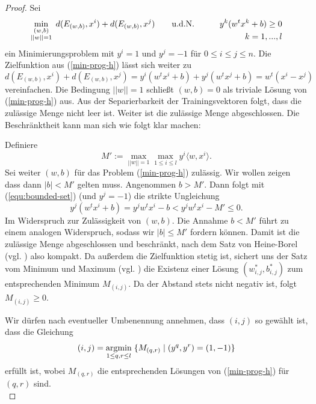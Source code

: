 \begin{proof}
	Sei 
	\begin{equation}
	\begin{aligned} \label{min-prog-h}
		& \smash{\min_{\substack{(w,b) \\ ||w||=1 }} \; 
				d(E_{(w,b)},x^i) + d(E_{(w,b)},x^j)
		} \qquad \text{u.d.N.} 
		\qquad & y^k(w^tx^k+b) \geq 0 \\
			   && k = 1,...,l
	\end{aligned}
	\end{equation}
	ein Minimierungsproblem mit $y^i=1$ und $y^j=-1$ für $0 \leq i \le j \leq n$. Die Zielfunktion aus (\ref{min-prog-h}) lässt sich weiter zu 
	\[
		 d(E_{(w,b)},x^i) +d(E_{(w,b)},x^j) = y^i(w^t x^i+b) + y^j(w^t x^j +b) = w^t(x^i-x^j)
	\]
	vereinfachen. 
	Die Bedingung $||w||=1$ schließt $(w,b)=0$ als triviale Lösung von (\ref{min-prog-h}) aus. Aus der Separierbarkeit der Trainingsvektoren folgt, dass die zulässige Menge nicht leer ist. Weiter ist die zulässige Menge abgeschlossen. Die Beschränktheit kann man sich wie folgt klar machen: 
	
	Definiere 
	\begin{equation}\label{equ:bounded-set}
	M' := \max_{||w|| = 1}{\max_{1 \leq i \leq l}{y^i \langle w, x^i \rangle}}.
	\end{equation}
	Sei weiter $(w,b)$ für das Problem (\ref{min-prog-h}) zulässig. Wir wollen zeigen dass dann $|b|<M'$ gelten muss.
	Angenommen $b > M'$. Dann folgt mit (\ref{equ:bounded-set}) (und $y^j=-1$) die strikte Ungleichung 
	$$
	y^j(w^t x^i + b) = y^j w^t x^i - b < y^j w^t x^i  - M' \leq 0.
	$$
	Im Widerspruch zur Zulässigkeit von $(w,b)$. Die Annahme $b < M'$ führt zu einem analogen Widerspruch, sodass wir $|b| \leq M'$ fordern können. 
	Damit ist die zulässige Menge abgeschlossen und beschränkt,	nach dem Satz von Heine-Borel (vgl. \cite{ae-ana1}) also kompakt. Da außerdem die Zielfunktion stetig ist, sichert uns der Satz vom Minimum und Maximum  (vgl. \cite{ae-ana1}) die Existenz einer Lösung $(w_{i,j}^*,b_{i,j}^*)$ zum entsprechenden Minimum  $M_{(i,j)}$. 
	Da der Abstand stets nicht negativ ist, folgt $M_{(i,j)} \geq 0$. 
	
	Wir dürfen nach eventueller Umbenennung annehmen, dass $(i,j)$ so gewählt ist, dass die Gleichung 
	$$
	(i,j) = \operatorname*{argmin}_{1\leq q,r \leq l} \; \{ M_{(q,r)} \mid (y^q,y^r)=(1,-1) \}
	$$ 
	erfüllt ist, wobei $M_{(q,r)}$ die entsprechenden Lösungen von (\ref{min-prog-h}) für $(q,r)$ sind. \\
	

\end{proof}
